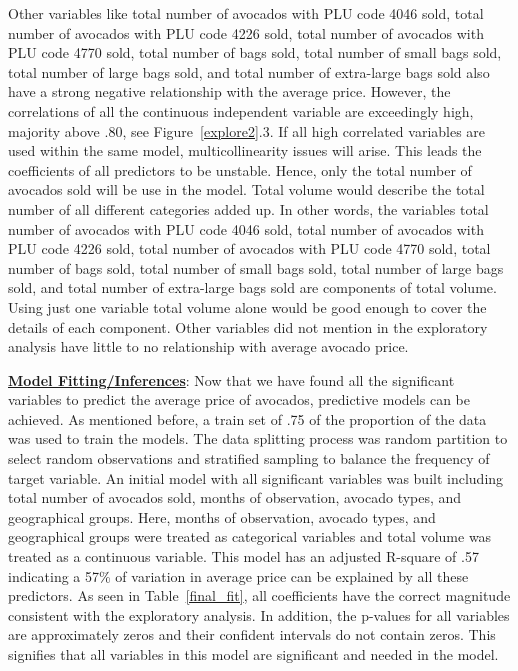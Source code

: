 \documentclass[11pt]{article}\usepackage[]{graphicx}\usepackage[]{color}
\begin{document}
\noindent Other variables like total number of avocados with PLU code 4046 sold, total number of avocados with PLU code 4226 sold, total number of avocados with PLU code 4770 sold, total number of bags sold, total number of small bags sold, total number of large bags sold, and total number of extra-large bags sold also have a strong negative relationship with the average price. However, the correlations of all the continuous independent variable are exceedingly high, majority above .80, see Figure~\ref{explore2}.3. If all high correlated variables are used within the same model, multicollinearity issues will arise. This leads the coefficients of all predictors to be unstable. Hence, only the total number of avocados sold will be use in the model. Total volume would describe the total number of all different categories added up. In other words, the variables total number of avocados with PLU code 4046 sold, total number of avocados with PLU code 4226 sold, total number of avocados with PLU code 4770 sold, total number of bags sold, total number of small bags sold, total number of large bags sold, and total number of extra-large bags sold are components of total volume. Using just one variable total volume alone would be good enough to cover the details of each component. Other variables did not mention in the exploratory analysis have little to no relationship with average avocado price.  
\hfill \break




\noindent\textbf{\underline{Model Fitting/Inferences}}: Now that we have found all the significant variables to predict the average price of avocados, predictive models can be achieved. As mentioned before, a train set of .75 of the proportion of the data was used to train the models. The data splitting process was random partition to select random observations and stratified sampling to balance the frequency of target variable. An initial model with all significant variables was built including total number of avocados sold, months of observation, avocado types, and geographical groups. Here, months of observation, avocado types, and geographical groups were treated as categorical variables and total volume was treated as a continuous variable. This model has an adjusted R-square of .57 indicating a 57\% of variation in average price can be explained by all these predictors. As seen in Table~\ref{final_fit}, all coefficients have the correct magnitude consistent with the exploratory analysis. In addition, the p-values for all variables are approximately zeros and their confident intervals do not contain zeros. This signifies that all variables in this model are significant and needed in the model.   
\end{document}
